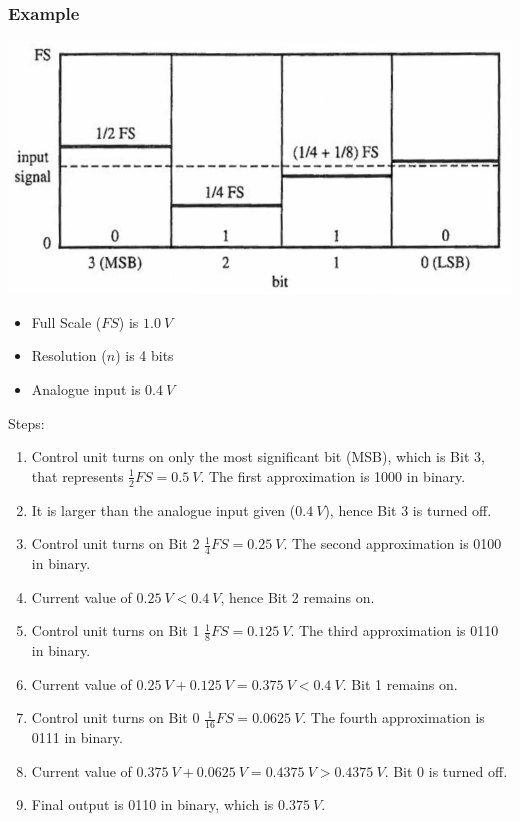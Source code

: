 \documentclass[11pt]{article}
\begin{document}
\subsubsection{Example}
\label{sec:org45f23b1}
\begin{center}
\includegraphics[scale=0.7]{./images/successive-approximation-example.png}
\end{center}

\begin{itemize}
\item Full Scale (\(FS\)) is \(\qty{1.0}{V}\)
\item Resolution (\(n\)) is 4 bits
\item Analogue input is \(\qty{0.4}{V}\)
\end{itemize}

Steps:
\begin{enumerate}
\item Control unit turns on only the most significant bit (MSB), which is Bit 3, that represents \(\frac{1}{2} FS = \qty{0.5}{V}\). The first approximation is 1000 in binary.
\item It is larger than the analogue input given (\(\qty{0.4}{V}\)), hence Bit 3 is turned off.
\item Control unit turns on Bit 2 \(\frac{1}{4} FS = \qty{0.25}{V}\). The second approximation is 0100 in binary.
\item Current value of \(\qty{0.25}{V} < \qty{0.4}{V}\), hence Bit 2 remains on.
\item Control unit turns on Bit 1 \(\frac{1}{8} FS = \qty{0.125}{V}\). The third approximation is 0110 in binary.
\item Current value of \(\qty{0.25}{V} + \qty{0.125}{V} = \qty{0.375}{V} < \qty{0.4}{V}\). Bit 1 remains on.
\item Control unit turns on Bit 0 \(\frac{1}{16} FS = \qty{0.0625}{V}\). The fourth approximation is 0111 in binary.
\item Current value of \(\qty{0.375}{V} + \qty{0.0625}{V} = \qty{0.4375}{V} > \qty{0.4375}{V}\). Bit 0 is turned off.
\item Final output is 0110 in binary, which is \(\qty{0.375}{V}\).
\end{enumerate}
\end{document}

